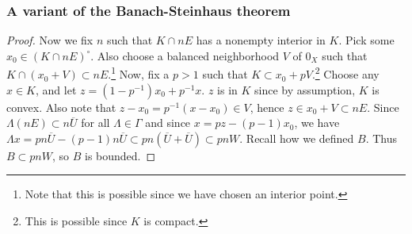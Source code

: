 \documentclass{beamer}
\begin{document}
\begin{frame}
\frametitle{A variant of the Banach-Steinhaus theorem}
\begin{proof}
    Now we fix $n$ such that $K \cap nE$ has a nonempty interior in $K$. Pick some $x_0 \in (K\cap nE)^\circ$. Also choose a balanced neighborhood $V$ of $0_X$ such that $K \cap (x_0+V)\subset nE$.\footnote{Note that this is possible since we have chosen an interior point.} Now, fix a $p>1$ such that $K \subset x_0 + pV$.\footnote{This is possible since $K$ is compact.} Choose any $x \in K$, and let $z = (1-p^{-1})x_0 + p^{-1}x$. $z$ is in $K$ since by assumption, $K$ is convex. Also note that $z - x_0 = p^{-1}(x-x_0) \in V$, hence $z \in x_0 + V \subset nE$. Since $\Lambda(nE) \subset n\overline{U}$ for all $\Lambda \in \Gamma$ and since $x = pz-(p-1)x_0$, we have $\Lambda x = pn\overline{U}-(p-1)n\overline{U} \subset pn(\overline{U}+\overline{U})\subset pnW$. Recall how we defined $B$. Thus $B \subset pnW$, so $B$ is bounded.
\end{proof}
\end{frame}
\end{document}
